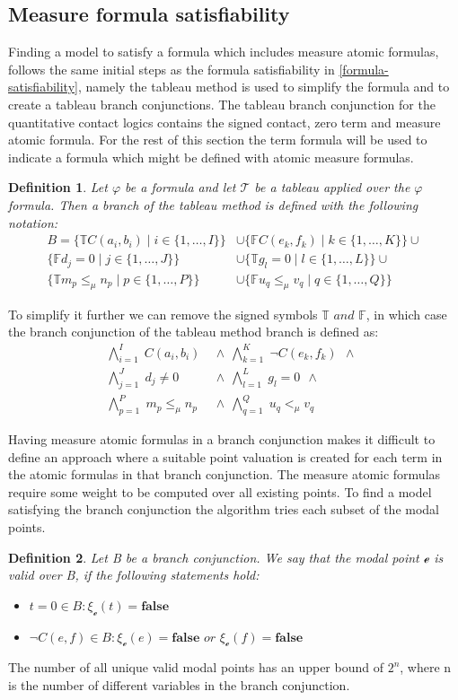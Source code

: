 \documentclass{article}
\newtheorem{defn}{Definition}[section]
\newcommand{\curvedE}{\mathscr{e}}
\newcommand{\vBool}{\xi}
\newcommand{\signT}{\mathbb{T}}
\newcommand{\signF}{\mathbb{F}}
\newcommand{\BranchConjunctionWithMeasure}{%
\begin{align*}
			\bigwedge_{i=1}^{I} \; C(a_i, b_i) \:\: & \wedge \:\: 
			\bigwedge_{k=1}^{K} \; \neg C(e_k, f_k) \:\: \wedge \:\: \\
			\bigwedge_{j=1}^{J} \; d_j \neq 0 \:\: & \wedge \:\:
			\bigwedge_{l=1}^{L} \; g_l = 0 \:\: \wedge \:\:\\
			\bigwedge_{p=1}^{P} \; m_p \le_\mu n_p \:\: &\wedge \:\:
			\bigwedge_{q=1}^{Q} \; u_q <_\mu v_q \:\:
\end{align*}%
}
\begin{document}
\subsection{Measure formula satisfiability}
	Finding a model to satisfy a formula which includes measure atomic formulas, follows the same initial steps as the formula satisfiability in \ref{formula-satisfiability}, 
	namely the tableau method is used to simplify the formula and to create a tableau branch conjunctions.
	The tableau branch conjunction for the quantitative contact logics contains the signed contact, zero term and measure atomic formula.
	For the rest of this section the term formula will be used to indicate a formula which might be defined with atomic measure formulas.

	\begin{defn}
		Let $\varphi$ be a formula and let $\mathcal{T}$ be a tableau applied over the $\varphi$ formula.
		Then a branch of the tableau method is defined with the following notation:
		\begin{align*}
				B = \{\signT C(a_i, b_i) \mid i \in \{1, \ldots, I\} \} &\cup 
					\{\signF C(e_k, f_k) \mid k \in \{1, \ldots, K\} \} \cup \\
					\{\signF d_j = 0 \mid j \in \{1, \ldots, J\} \} &\cup 
					\{\signT g_l = 0 \mid l \in \{1, \ldots, L\} \} \cup \\
					\{\signT m_p \le_\mu n_p \mid p \in \{1, \ldots, P\} \} &\cup
					\{\signF u_q \le_\mu v_q \mid q \in \{1, \ldots, Q\} \}
		\end{align*}
	\end{defn}
	To simplify it further we can remove the signed symbols $\signT \textit{ and } \signF$, in which case the branch conjunction of the tableau method branch is defined as:
	\BranchConjunctionWithMeasure

	Having measure atomic formulas in a branch conjunction makes it difficult to define an approach where a suitable point valuation is created for each term 
	in the atomic formulas in that branch conjunction.
	The measure atomic formulas require some weight to be computed over all existing points. 
	To find a model satisfying the branch conjunction the algorithm tries each subset of the modal points.

	\begin{defn}%
	Let B be a branch conjunction. We say that the modal point $\curvedE$ is valid over B, if the following statements hold:
	\begin{itemize}
		\item $t = 0 \in B:  \vBool_{\curvedE}(t) = \textbf{false}$
		\item $\neg C(e, f) \in B: \vBool_{\curvedE}(e) = \textbf{false} \textit{ or } \vBool_{\curvedE}(f) = \textbf{false}$
	\end{itemize}
	\end{defn}
	The number of all unique valid modal points has an upper bound of $2^n$, where n is the number of different variables in the branch	conjunction.
\end{document}
